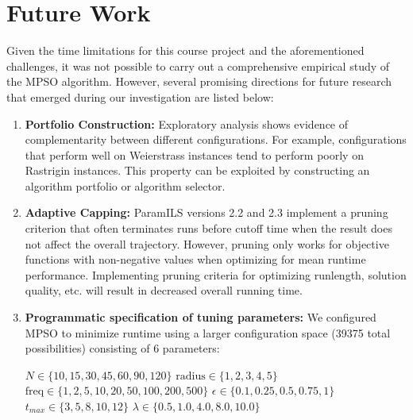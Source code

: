 \section{Future Work}

Given the time limitations for this course project and the aforementioned challenges, it was not possible to carry out a comprehensive empirical study of the MPSO algorithm. However, several promising directions for future research that emerged during our investigation are listed below:\\

\begin{enumerate}

\item \textbf{Portfolio Construction:} Exploratory analysis shows evidence of complementarity between different configurations. For example, configurations that perform well on Weierstrass instances tend to perform poorly on Rastrigin instances. This property can be exploited by constructing an algorithm portfolio or algorithm selector.

\item \textbf{Adaptive Capping:} ParamILS versions 2.2 and 2.3 implement a pruning criterion that often terminates runs before cutoff time when the result does not affect the overall trajectory. However, pruning only works for objective functions with non-negative values when optimizing for mean runtime performance. Implementing pruning criteria for optimizing runlength, solution quality, etc. will result in decreased overall running time. 

\item \textbf{Programmatic specification of tuning parameters:} We configured MPSO to minimize runtime using a larger configuration space (39375 total possibilities) consisting of 6 parameters: \newline

$N \in \{ 10, 15, 30, 45, 60, 90, 120 \}$ \quad [Default: $30$] \newline
$\text{radius} \in \{ 1, 2, 3, 4, 5 \}$ \quad [Default: $1$] \newline
$\text{freq} \in \{ 1, 2, 5, 10, 20, 50, 100, 200, 500 \}$ \quad [Default: $10$] \newline
$\epsilon \in \{ 0.1, 0.25, 0.5, 0.75, 1 \}$ \quad [Default: $0.1$] \newline
$t_{max} \in \{ 3, 5, 8, 10, 12 \}$ \quad [Default: $5$] \newline
$\lambda \in \{ 0.5, 1.0, 4.0, 8.0, 10.0 \}$ \quad [Default: $1.0$] \newline


\end{enumerate}
